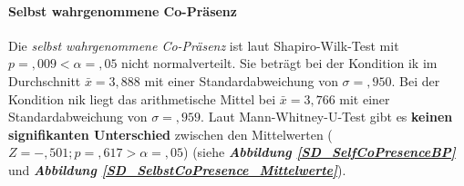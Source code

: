 \documentclass[a4paper,11pt]{article}%
\renewcommand{\\}{\vspace*{0.5\baselineskip} \newline}
\begin{document}
{\newpage

\paragraph{Selbst wahrgenommene Co-Präsenz}
Die \textit{selbst wahrgenommene Co-Präsenz} ist laut Shapiro-Wilk-Test mit $p =,009 < \alpha = ,05$ nicht normalverteilt.
Sie beträgt bei der Kondition \ac{ik} im Durchschnitt $\bar{x} = 3,888$ mit einer Standardabweichung von $\sigma =,950$.
Bei der Kondition \newline \ac{nik} liegt das arithmetische Mittel bei $\bar{x} = 3,766$ mit einer Standardabweichung von $\sigma =,959$. 
Laut Mann-Whitney-U-Test gibt es \textbf{keinen signifikanten Unterschied} zwischen den Mittelwerten ($ Z = -,501; p =,617 > \alpha = ,05$) (siehe \textbf{\textit{Abbildung \ref{SD_SelfCoPresenceBP}}} und \textbf{\textit{Abbildung \ref{SD_SelbstCoPresence_Mittelwerte}}}).
	
}
\end{document}

